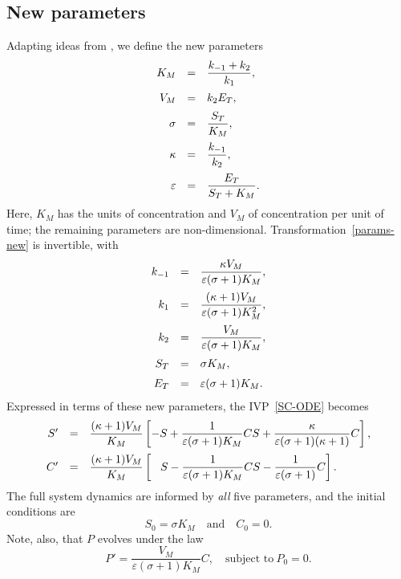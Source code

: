 \documentclass[11pt]{article}
\newcommand{\eps}{\varepsilon}
\newcommand{\be}{\begin{equation}}
\newcommand{\ee}{\end{equation}}
\newcommand{\dst}{\displaystyle}
\begin{document}
\subsection{New parameters}
%
Adapting ideas from \cite{SS89},
we define the new parameters
%
\be
\begin{array}{rclcl}
 K_M &=& \dst\frac{k_{-1} + k_2}{k_1} ,
\vspace{2mm}\\
 V_M &=& k_2 E_T ,
\vspace{2mm}\\
 \sigma &=& \dst\frac{S_T}{K_M} ,
\vspace{2mm}\\
 \kappa &=& \dst\frac{k_{-1}}{k_2} ,
\vspace{2mm}\\
 \eps &=& \dst\frac{E_T}{S_T + K_M} .
\end{array}
\label{params-new}
\ee
%
Here, $K_M$ has the units of concentration
and $V_M$ of concentration per unit of time;
the remaining parameters are non-dimensional.
Transformation~\eqref{params-new} is invertible, with
%
\be
\begin{array}{rclcl}
 k_{-1} &=& \dst\frac{\kappa V_M}{\eps (\sigma+1) K_M} ,
\vspace{2mm}\\
 k_1 &=& \dst\frac{(\kappa+1) V_M}{\eps (\sigma+1) K_M^2} ,
\vspace{2mm}\\
 k_2 &=& \dst\frac{V_M}{\eps (\sigma+1) K_M} ,
\vspace{2mm}\\
 S_T &=& \dst\sigma K_M ,
\vspace{2mm}\\
 E_T &=& \dst\eps (\sigma+1) K_M .
\end{array}
\label{params-old}
\ee
%
Expressed in terms of these new parameters,
the IVP~\eqref{SC-ODE} becomes
%
\be
\begin{array}{rclcl}
 S'
&=&
\dst
 \frac{(\kappa+1)V_M}{K_M}
\left[
 -S
+
 \frac{1}{\eps(\sigma+1)K_M} C S
+
 \frac{\kappa}{\eps(\sigma+1)(\kappa+1)} C
\right] ,
\vspace{2mm}\\
 C'
&=&
\dst
 \frac{(\kappa+1)V_M}{K_M}
\left[
\ \ \,
 S
-
 \frac{1}{\eps(\sigma+1)K_M} C S
-
 \frac{1}{\eps(\sigma+1)} C
\right] .
\end{array}
\label{SC-ODE-new}
\ee
%
The full system dynamics are informed
by \textit{all} five parameters,
and the initial conditions are
%
\be
 S_0 = \sigma K_M
\quad\mbox{and}\quad
 C_0 = 0 .
\label{SC-IC-new}
\ee
%
Note, also, that $P$ evolves under the law
%
\be
 P' = \frac{V_M}{\eps (\sigma+1) K_M} C ,
\quad\mbox{subject to}\
 P_0 = 0 .
\label{P-IVP-new}
\ee
%
\end{document}
